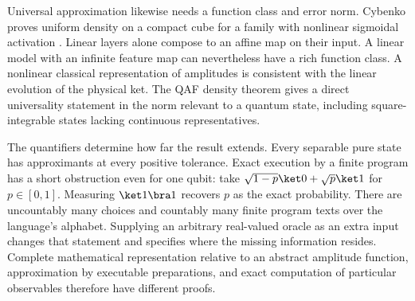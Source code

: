 Universal approximation likewise needs a function class and error norm. Cybenko proves uniform density on a compact cube for a family with nonlinear sigmoidal activation \cite{cybenko}. Linear layers alone compose to an affine map on their input. A linear model with an infinite feature map can nevertheless have a rich function class. A nonlinear classical representation of amplitudes is consistent with the linear evolution of the physical ket. The QAF density theorem gives a direct universality statement in the norm relevant to a quantum state, including square-integrable states lacking continuous representatives.

The quantifiers determine how far the result extends. Every separable pure state has approximants at every positive tolerance. Exact execution by a finite program has a short obstruction even for one qubit: take $\sqrt{1-p}\ket0+\sqrt p\ket1$ for $p\in[0,1]$. Measuring $\ket1\bra1$ recovers $p$ as the exact probability. There are uncountably many choices and countably many finite program texts over the language's alphabet. Supplying an arbitrary real-valued oracle as an extra input changes that statement and specifies where the missing information resides. Complete mathematical representation relative to an abstract amplitude function, approximation by executable preparations, and exact computation of particular observables therefore have different proofs.
